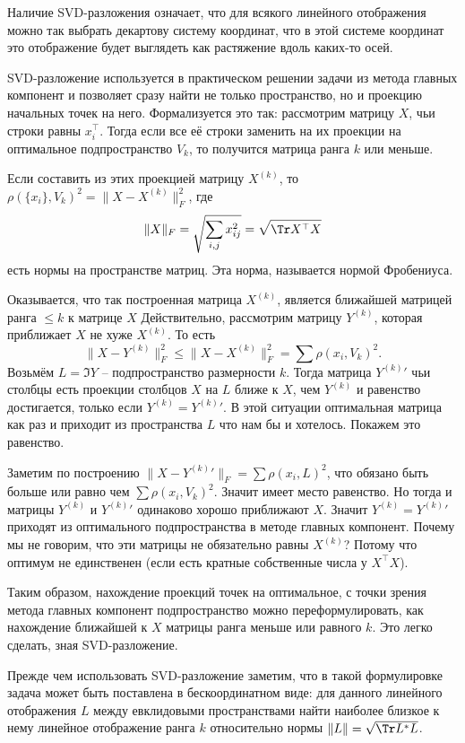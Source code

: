 Наличие SVD-разложения означает, что для всякого линейного отображения можно так выбрать декартову систему координат, что в этой системе координат это отображение будет выглядеть как растяжение вдоль каких-то осей.





SVD-разложение используется в практическом решении задачи из метода главных компонент и позволяет сразу найти не только пространство, но и проекцию начальных точек на него. Формализуется это так: рассмотрим матрицу $X$, чьи строки равны $x_i^{\top}$. Тогда если все её строки заменить на их проекции на оптимальное подпространство $V_k$, то получится матрица ранга $k$ или меньше.

Если составить из этих проекцией матрицу $X^{(k)}$, то $\rho(\{x_i\}, V_k)^2= \|X-X^{(k)}\|_F^2 $, где 
$$\|X\|_F=\sqrt{\sum_{i,j} x_{ij}^2}=\sqrt{\Tr X^{\top}X}$$
есть нормы на пространстве матриц. Эта норма, называется нормой Фробениуса.

Оказывается, что так построенная матрица $X^{(k)}$, является ближайшей матрицей ранга $\leq k$ к матрице $X$
Действительно, рассмотрим матрицу $Y^{(k)}$, которая приближает $X$ не хуже $X^{(k)}$. То есть 
$$\|X -Y^{(k)}\|_F^2 \leq \| X-X^{(k)}\|_F^2= \sum \rho(x_i, V_k)^2.$$
Возьмём $L=\Im Y$ -- подпространство размерности $k$. Тогда матрица ${Y^{(k)}}'$ чьи столбцы есть проекции столбцов $X$ на $L$ ближе к $X$, чем $Y^{(k)}$ и равенство достигается, только если $Y^{(k)}={Y^{(k)}}'$. В этой ситуации оптимальная матрица как раз и приходит из пространства $L$ что нам бы и хотелось. Покажем это равенство.

Заметим по построению $\| X - {Y^{(k)}}'\|_F = \sum \rho (x_i, L)^2$, что обязано быть больше или равно чем $\sum \rho(x_i, V_k)^2$. Значит имеет место равенство. Но тогда и матрицы $Y^{(k)}$ и ${Y^{(k)}}'$ одинаково хорошо приближают $X$. Значит $Y^{(k)}={Y^{(k)}}'$ приходят из оптимального подпространства в методе главных компонент. Почему мы не говорим, что эти матрицы не обязательно равны $X^{(k)}$? Потому что оптимум не единственен (если есть кратные собственные числа у $X^\top X$).


Таким образом, нахождение проекций точек на оптимальное, с точки зрения метода главных компонент подпространство можно переформулировать, как нахождение ближайшей к $X$ матрицы ранга меньше или равного $k$. Это легко сделать, зная SVD-разложение.

Прежде чем использовать SVD-разложение заметим, что в такой формулировке задача может быть поставлена в бескоординатном виде: для данного линейного отображения $L$ между евклидовыми пространствами найти наиболее близкое к нему линейное отображение ранга $k$ относительно нормы $\|L\|=\sqrt{\Tr L^*L}$.

